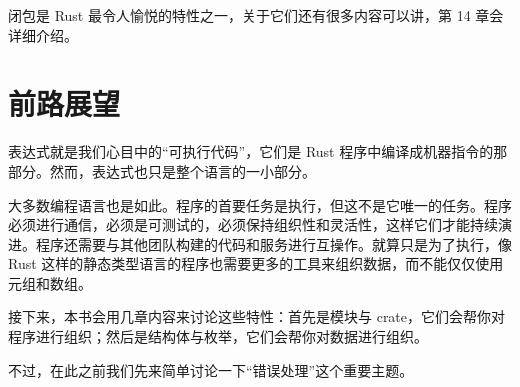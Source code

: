 闭包是 Rust 最令人愉悦的特性之一，关于它们还有很多内容可以讲，第 14 章会详细介绍。

\section{前路展望}

表达式就是我们心目中的“可执行代码”，它们是 Rust 程序中编译成机器指令的那部分。然而，表达式也只是整个语言的一小部分。

大多数编程语言也是如此。程序的首要任务是执行，但这不是它唯一的任务。程序必须进行通信，必须是可测试的，必须保持组织性和灵活性，这样它们才能持续演进。程序还需要与其他团队构建的代码和服务进行互操作。就算只是为了执行，像 Rust 这样的静态类型语言的程序也需要更多的工具来组织数据，而不能仅仅使用元组和数组。

接下来，本书会用几章内容来讨论这些特性：首先是模块与 crate，它们会帮你对程序进行组织；然后是结构体与枚举，它们会帮你对数据进行组织。

不过，在此之前我们先来简单讨论一下“错误处理”这个重要主题。

